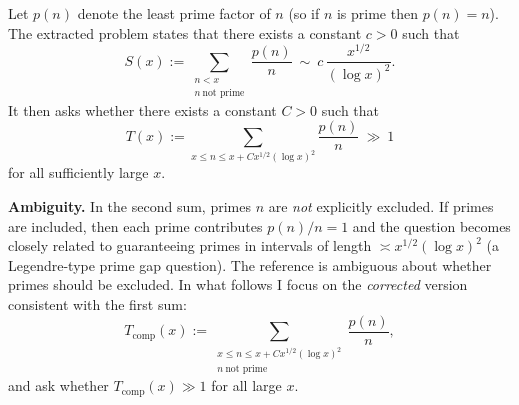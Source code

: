 Let $p(n)$ denote the least prime factor of $n$ (so if $n$ is prime then $p(n)=n$).
The extracted problem states that there exists a constant $c>0$ such that
\[S(x):=\sum_{\substack{n<x\\ n\ \textrm{not prime}}}\frac{p(n)}{n}\ \sim\ c\,\frac{x^{1/2}}{(\log x)^2}.
\]
It then asks whether there exists a constant $C>0$ such that
\[T(x):=\sum_{x\le n\le x+C x^{1/2}(\log x)^2}\frac{p(n)}{n}\ \gg\ 1\]
for all sufficiently large $x$.

\textbf{Ambiguity.} In the second sum, primes $n$ are \emph{not} explicitly excluded. If primes are included, then each prime contributes $p(n)/n=1$ and the question becomes closely related to guaranteeing primes in intervals of length $\asymp x^{1/2}(\log x)^2$ (a Legendre-type prime gap question).  The reference is ambiguous about whether primes should be excluded.  In what follows I focus on the \emph{corrected} version consistent with the first sum:
\[T_{\mathrm{comp}}(x):=\sum_{\substack{x\le n\le x+C x^{1/2}(\log x)^2\\ n\ \textrm{not prime}}}\frac{p(n)}{n},\]
and ask whether $T_{\mathrm{comp}}(x)\gg 1$ for all large $x$.
